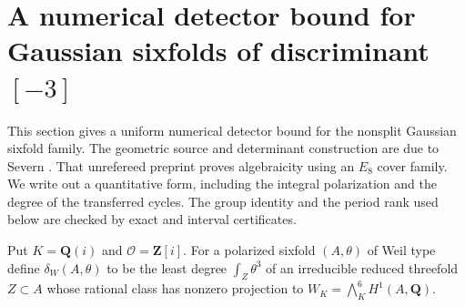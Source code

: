 \documentclass[11pt]{article}
\theoremstyle{definition}
\theoremstyle{remark}
\begin{document}
\section{A numerical detector bound for Gaussian sixfolds of discriminant \texorpdfstring{$[-3]$}{[-3]}}
\label{sec:gaussian-discriminant-verified}

This section gives a uniform numerical detector bound for the
nonsplit Gaussian sixfold family.  The geometric source and determinant
construction are due to Severn \cite[Theorems~A--C, Sections~3--7
and Appendices~A--B]{SevernGaussian}.  That unrefereed preprint proves
algebraicity using an $E_8$ cover family.  We write out a quantitative
form, including the integral polarization and the degree of the
transferred cycles.  The group identity and the period rank used below
are checked by exact and interval certificates.

Put $K=\mathbf Q(i)$ and $\mathcal O=\mathbf Z[i]$.
For a polarized sixfold $(A,\theta)$ of Weil type define
$\delta_W(A,\theta)$ to be the least degree $\int_Z\theta^3$ of an
irreducible reduced threefold $Z\subset A$ whose rational class has
nonzero projection to $W_K=\bigwedge_K^6H^1(A,\mathbf Q)$.
\end{document}

